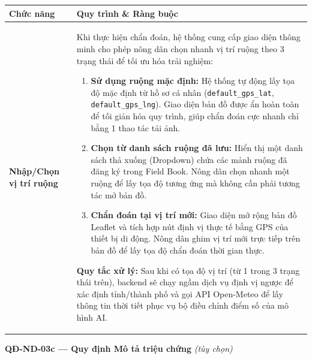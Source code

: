 \documentclass[12pt,a4paper]{article}
\begin{document}
\begin{longtable}{|
        >{\raggedright\arraybackslash}p{2.8cm}|
        >{\raggedright\arraybackslash}p{12cm}|}
    \hline
    \rowcolor{headerblue}
    \textbf{Chức năng}              & \textbf{Quy trình \& Ràng buộc}                                                                                                                                                                                     \\
    \hline
    \endhead
    \textbf{Nhập/Chọn vị trí ruộng} &
    Khi thực hiện chẩn đoán, hệ thống cung cấp giao diện thông minh cho phép nông dân chọn nhanh vị trí ruộng theo 3 trạng thái để tối ưu hóa trải nghiệm:
    \begin{enumerate}[leftmargin=*,topsep=2pt,itemsep=1pt]
        \item \textbf{Sử dụng ruộng mặc định:} Hệ thống tự động lấy tọa độ mặc định từ hồ sơ cá nhân (\texttt{default\_gps\_lat}, \texttt{default\_gps\_lng}). Giao diện bản đồ được ẩn hoàn toàn để tối giản hóa quy trình, giúp chẩn đoán cực nhanh chỉ bằng 1 thao tác tải ảnh.
        \item \textbf{Chọn từ danh sách ruộng đã lưu:} Hiển thị một danh sách thả xuống (Dropdown) chứa các mảnh ruộng đã đăng ký trong Field Book. Nông dân chọn nhanh một ruộng để lấy tọa độ tương ứng mà không cần phải tương tác mở bản đồ.
        \item \textbf{Chẩn đoán tại vị trí mới:} Giao diện mở rộng bản đồ Leaflet và tích hợp nút định vị thực tế bằng GPS của thiết bị di động. Nông dân ghim vị trí mới trực tiếp trên bản đồ để lấy tọa độ chẩn đoán thời gian thực.
    \end{enumerate}
    \textbf{Quy tắc xử lý:} Sau khi có tọa độ vị trí (từ 1 trong 3 trạng thái trên), backend sẽ chạy ngầm dịch vụ định vị ngược để xác định tỉnh/thành phố và gọi API Open-Meteo để lấy thông tin thời tiết phục vụ bộ điều chỉnh điểm số của mô hình AI. \\
    \hline
\end{longtable}

\vspace{0.3cm}
\noindent\textbf{QĐ-ND-03c --- Quy định Mô tả triệu chứng} \textit{(tùy chọn)}
\end{document}
